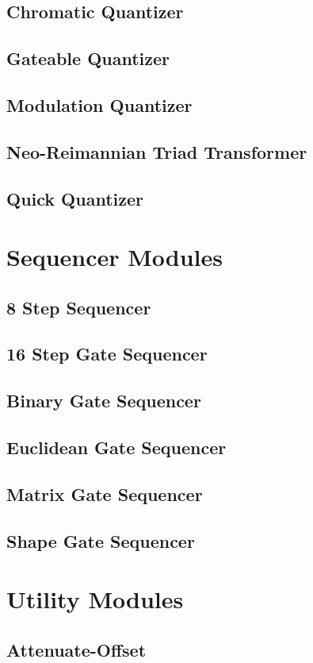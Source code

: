 \documentclass[11pt]{book}
\begin{document}
\section{Chromatic Quantizer}
\section{Gateable Quantizer}
\section{Modulation Quantizer}
\section{Neo-Reimannian Triad Transformer}
\section{Quick Quantizer}

\chapter{Sequencer Modules}
\section{8 Step Sequencer}
\section{16 Step Gate Sequencer}
\section{Binary Gate Sequencer}
\section{Euclidean Gate Sequencer}
\section{Matrix Gate Sequencer}
\section{Shape Gate Sequencer}

\chapter{Utility Modules}
\section{Attenuate-Offset}
\end{document}
